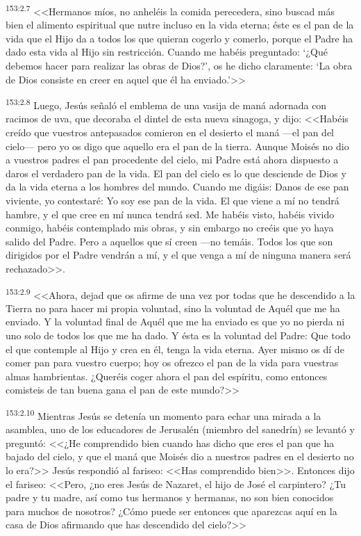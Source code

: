 \par 
\textsuperscript{153:2.7} <<Hermanos míos, no anheléis la comida perecedera, sino buscad más bien el alimento espiritual que nutre incluso en la vida eterna; éste es el pan de la vida que el Hijo da a todos los que quieran cogerlo y comerlo, porque el Padre ha dado esta vida al Hijo sin restricción. Cuando me habéis preguntado: `¿Qué debemos hacer para realizar las obras de Dios?', os he dicho claramente: `La obra de Dios consiste en creer en aquel que él ha enviado.'>>

\par 
\textsuperscript{153:2.8} Luego, Jesús señaló el emblema de una vasija de maná adornada con racimos de uva, que decoraba el dintel de esta nueva sinagoga, y dijo: <<Habéis creído que vuestros antepasados comieron en el desierto el maná ---el pan del cielo--- pero yo os digo que aquello era el pan de la tierra. Aunque Moisés no dio a vuestros padres el pan procedente del cielo, mi Padre está ahora dispuesto a daros el verdadero pan de la vida. El pan del cielo es lo que desciende de Dios y da la vida eterna a los hombres del mundo. Cuando me digáis: Danos de ese pan viviente, yo contestaré: Yo soy ese pan de la vida. El que viene a mí no tendrá hambre, y el que cree en mí nunca tendrá sed. Me habéis visto, habéis vivido conmigo, habéis contemplado mis obras, y sin embargo no creéis que yo haya salido del Padre. Pero a aquellos que sí creen ---no temáis. Todos los que son dirigidos por el Padre vendrán a mí, y el que venga a mí de ninguna manera será rechazado>>.

\par 
\textsuperscript{153:2.9} <<Ahora, dejad que os afirme de una vez por todas que he descendido a la Tierra no para hacer mi propia voluntad, sino la voluntad de Aquél que me ha enviado. Y la voluntad final de Aquél que me ha enviado es que yo no pierda ni uno solo de todos los que me ha dado. Y ésta es la voluntad del Padre: Que todo el que contemple al Hijo y crea en él, tenga la vida eterna. Ayer mismo os dí de comer pan para vuestro cuerpo; hoy os ofrezco el pan de la vida para vuestras almas hambrientas. ¿Queréis coger ahora el pan del espíritu, como entonces comisteis de tan buena gana el pan de este mundo?>>

\par 
\textsuperscript{153:2.10} Mientras Jesús se detenía un momento para echar una mirada a la asamblea, uno de los educadores de Jerusalén (miembro del sanedrín) se levantó y preguntó: <<¿He comprendido bien cuando has dicho que eres el pan que ha bajado del cielo, y que el maná que Moisés dio a nuestros padres en el desierto no lo era?>> Jesús respondió al fariseo: <<Has comprendido bien>>. Entonces dijo el fariseo: <<Pero, ¿no eres Jesús de Nazaret, el hijo de José el carpintero? ¿Tu padre y tu madre, así como tus hermanos y hermanas, no son bien conocidos para muchos de nosotros? ¿Cómo puede ser entonces que aparezcas aquí en la casa de Dios afirmando que has descendido del cielo?>>

